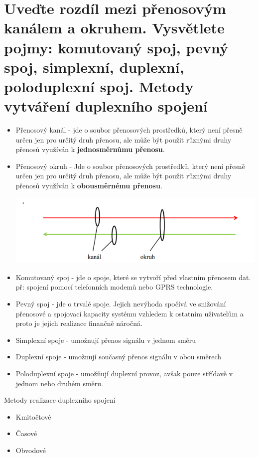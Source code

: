 \section{Uveďte rozdíl mezi přenosovým kanálem a okruhem. Vysvětlete pojmy: komutovaný spoj, pevný spoj, simplexní, duplexní, poloduplexní spoj. Metody vytváření duplexního spojení}
\begin{itemize}
    \item Přenosový kanál - jde o soubor přenosových prostředků, který není přesně určen jen pro určitý druh přenosu, ale může být použit různými druhy přenosů využíván k  \textbf{jednosměrnůmu přenosu}.

    \item Přenosový okruh - Jde o soubor přenosových prostředků, který není přesně určen jen pro určitý druh přenosu, ale může být použit různými druhy přenosů využíván k \textbf{obousměrnému přenosu}.
    
    \includegraphics[]{images/okruh_kanal.png}
    
    \item Komutovaný spoj - jde o spoje, které se vytvoří před vlastním přenosem dat. př: spojení pomocí telefonních modemů nebo GPRS technologie.
    \item Pevný spoj - jde o trvalé spoje. Jejich nevýhoda spočívá ve snižování přenosové a spojovací kapacity systému vzhledem k ostatním uživatelům a proto je jejich realizace finančně náročná.
    \item Simplexní spoje - umožnují přenos signálu v jednom směru
    \item Duplexní spoje - umožnují současný přenos signálu v obou směrech
    \item Poloduplexní spoje - umožňují duplexní provoz, avšak pouze střídavě v jednom nebo druhém směru.
\end{itemize}
Metody realizace duplexního spojení
\begin{itemize}
    \item Kmitočtové
    \item Časové
    \item Obvodové
\end{itemize}

